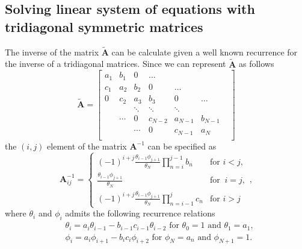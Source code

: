 \documentclass[article,moreauthors,pdftex,10pt,a4paper]{ssrn}
\begin{document}
\subsection{Solving linear system of equations with tridiagonal symmetric matrices}
The inverse of the matrix $\tilde{\mathbf{A}}$ can be calculate given a well known recurrence for the inverse of a tridiagonal matrices. Since we can represent  $\tilde{\mathbf{A}}$ as follows
\begin{equation*}
\tilde{\mathbf{A}} = \begin{bmatrix}
a_1 & b_1 & 0 & \ldots &  \\
c_1 & a_2 & b_2 & 0 & \ldots &  \\
0 & c_2 & a_3 & b_3 & 0 & \ldots &  \\
&  & \ddots & \ddots & \ddots &  \\
& \cdots &0 & c_{N-2} & a_{N-1} & b_{N-1} \\
& & \cdots &0 & c_{N-1} & a_N \\
\end{bmatrix}
\end{equation*}
the $(i,j)$ element of the matrix $\mathbf{A}^{-1}$ can be specified as
\begin{equation}
\mathbf{A}^{-1}_{ij} = 
\begin{cases}
(-1)^{i+j} \frac{\theta_{i-1} \phi_{j+1} }{\theta_N} \prod_{n = i}^{j-1} b_n & \text{for } i <j, \\ 
\frac{\theta_{i-1} \phi_{j+1} }{\theta_N} & \text{for } \  i = j, \\ 
(-1)^{i+j} \frac{\theta_{i-1} \phi_{j+1} }{\theta_N} \prod_{n = i-1}^{j} c_n & \text{for } i > j 
\end{cases},
\end{equation}  
where $\theta_i$ and $\phi_i$ admits the following recurrence relations
\begin{align*}
& \theta_i = a_i \theta_{i-1} - b_{i-1} c_{i-1} \theta_{i-2} \text{ for } \theta_0 = 1 \text{ and } \theta_1 = a_1, \\
& \phi_i = a_i \phi_{i+1} - b_i c_i \phi_{i+2} \text{ for } \phi_N = a_n \text{ and } \phi_{N+1} = 1.
\end{align*}
\end{document}
